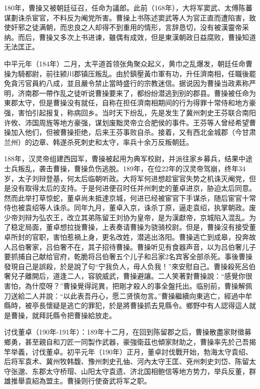 180年，曹操又被朝廷征召，任命为議郎。此前（168年），大将军窦武、太傅陈蕃谋劃诛杀宦官，不料反为阉党所害。曹操上书陈述窦武等人为官正直而遭陷害，致使奸邪之徒满朝，而忠良之人却得不到重用的情形，言辞恳切，没有被漢靈帝采纳。而后，曹操又多次上书进谏，雖偶有成效，但是東漢朝政日益腐败，曹操知道无法匡正。

中平元年（184年）二月，太平道首领张角聚众起义，黄巾之乱爆发，朝廷任命曹操为騎都尉，前往颍川郡镇压叛乱。由於鎮壓黃巾軍有功，升任濟南相，任職後罷免貪污官員約八成，並且嚴令禁止當時盛行的宗教迷信。据说因为曹操当政素称严明，济南郡一帶作乱之徒听说曹操要来了，都纷纷潜逃到别的郡县。曹操被任命为東郡太守，但是曹操没有就任，自称在担任濟南相期间的行为得罪十常侍和地方豪强，害怕引起报复，称病回乡。当时天下纷乱，先是发生了冀州刺史王芬联合南阳许攸、沛国周旌等地方豪强，谋划废黜灵帝立合肥侯的事件。王芬等人曾经希望曹操加入他们，但被曹操拒绝，后来王芬事败自杀。接着，又有西北金城郡（今甘肃兰州）的边章、韩遂杀死刺史和太守，率兵十余万反叛朝廷。

188年，汉灵帝组建西园军，曹操被起用为典军校尉，并派往家乡募兵，结果中途士兵叛乱，袭击曹操，曹操负伤逃脱。189年，在位22年的汉灵帝驾崩，终年34岁，太子刘辩登基，何太后临朝听政。大将军何进想趁宦官失势之机诛灭阉党，但是没有取得太后的支持。于是何进便召时任并州刺史的董卓进京，胁迫太后同意。然而此举打草惊蛇，董卓尚未抵達京城，何进已经被宦官下手谋杀，随后宦官十常侍也被袁绍等人诛杀。同年九月，董卓入京，诛杀丁原，逼走袁绍，执掌朝政。废少帝刘辩为弘农王，改立其弟陈留王刘协为皇帝，是为漢獻帝，京城陷入混乱。为了稳定局面，董卓想拉拢曹操，上表奏请曹操为骁骑校尉。但是，曹操沒有接受董卓所封的官职，害怕惹禍上身，更名改姓，潜逃出洛阳。曹操逃亡到成皋，投奔故人吕伯奢家，吕伯奢不在，其子招待曹操。曹操听见有食器声音，以为吕伯奢儿子要抓捕自己献给官府，乾脆将吕伯奢五个儿子和吕家2名宾客全部杀死。事後曹操發現自己是誤殺，於是說了句“宁我负人，毋人负我！”來安慰自己。曹操殺死呂伯奢兒子離開后，道逢二人，容貌威武，曹操避讓。二人笑著對曹操說：“感覺你很害怕，為什麼呀？”曹操覺得詫異，把剛才殺人的事全盤托出。临别前，曹操解佩刀送給二人并說：“以此表吾丹心，愿二贤慎勿言。”曹操繼續向東逃亡，經過中牟縣時，被亭長懷疑是逃亡的罪犯，於是將曹操抓去見縣令。鄉野中有人認得這人就是曹操，就拜託縣令把曹操給放走。

讨伐董卓（190年-191年）：189年十二月，在回到陈留郡之后，曹操散盡家財徵募鄉勇，甚至親自和刀匠一同製作武器，豪強衛茲也傾家財助之，曹操率先於己吾揭竿举義，讨伐董卓。初平元年（190年）正月，董卓討伐戰开始，勃海太守袁绍、后将军袁术、冀州牧韩馥、豫州刺史孔伷、河內太守王匡、兗州刺史刘岱、陈留太守张邈、东郡太守桥瑁、山阳太守袁遗、济北国相鲍信等地方势力，举兵反董，群雄推舉袁紹為盟主。曹操则行使奋武将军之职。

